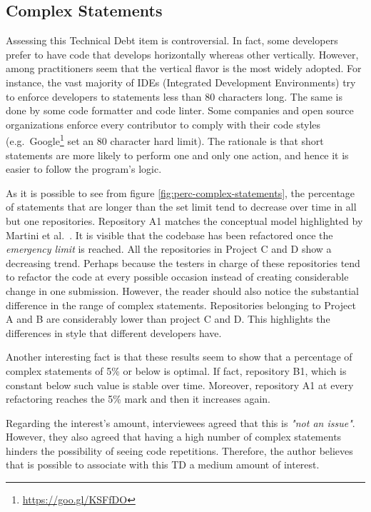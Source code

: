	\subsection{Complex Statements}


	Assessing this Technical Debt item is controversial. In fact, some developers prefer to have code that develops horizontally whereas other vertically. However, among practitioners seem that the vertical flavor is the most widely adopted. For instance, the vast majority of IDEs (Integrated Development Environments) try to enforce developers to statements less than 80 characters long. The same is done by some code formatter and code linter. Some companies and open source organizations enforce every contributor to comply with their code styles (e.g.\ Google\footnote{\href{https://goo.gl/KSFfDO}{https://goo.gl/KSFfDO}} set an 80 character hard limit). The rationale is that short statements are more likely to perform one and only one action, and hence it is easier to follow the program's logic.

    As it is possible to see from figure \ref{fig:perc-complex-statements}, the percentage of statements that are longer than the set limit tend to decrease over time in all but one repositories. Repository A1 matches the conceptual model highlighted by Martini et al.\ \cite{martini2014architecture}. It is visible that the codebase has been refactored once the \textit{emergency limit} is reached. All the repositories in Project C and D show a decreasing trend. Perhaps because the testers in charge of these repositories tend to refactor the code at every possible occasion instead of creating considerable change in one submission. However, the reader should also notice the substantial difference in the range of complex statements. Repositories belonging to Project A and B are considerably lower than project C and D. This highlights the differences in style that different developers have.

    Another interesting fact is that these results seem to show that a percentage of complex statements of 5\% or below is optimal. If fact, repository B1, which is constant below such value is stable over time. Moreover, repository A1 at every refactoring reaches the 5\% mark and then it increases again.

     \label{sec:disc-rq3-complex-statements}
    Regarding the interest's amount, interviewees agreed that this is \textit{"not an issue"}. However, they also agreed that having a high number of complex statements hinders the possibility of seeing code repetitions. Therefore, the author believes that is possible to associate with this TD a medium amount of interest.


